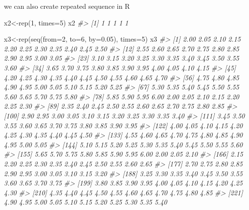 \documentclass[
]{article}
\newenvironment{Shaded}{\begin{snugshade}}{\end{snugshade}}
\newcommand{\AttributeTok}[1]{\textcolor[rgb]{0.77,0.63,0.00}{#1}}
\newcommand{\CommentTok}[1]{\textcolor[rgb]{0.56,0.35,0.01}{\textit{#1}}}
\newcommand{\DecValTok}[1]{\textcolor[rgb]{0.00,0.00,0.81}{#1}}
\newcommand{\FloatTok}[1]{\textcolor[rgb]{0.00,0.00,0.81}{#1}}
\newcommand{\FunctionTok}[1]{\textcolor[rgb]{0.00,0.00,0.00}{#1}}
\newcommand{\NormalTok}[1]{#1}
\newcommand{\OtherTok}[1]{\textcolor[rgb]{0.56,0.35,0.01}{#1}}
\begin{document}
we can also create repeated sequence in R

\begin{Shaded}
\begin{Highlighting}[]
\NormalTok{x2}\OtherTok{\textless{}{-}}\FunctionTok{rep}\NormalTok{(}\DecValTok{1}\NormalTok{, }\AttributeTok{times=}\DecValTok{5}\NormalTok{)}
\NormalTok{x2}
\CommentTok{\#\textgreater{} [1] 1 1 1 1 1}

\NormalTok{x3}\OtherTok{\textless{}{-}}\FunctionTok{rep}\NormalTok{(}\FunctionTok{seq}\NormalTok{(}\AttributeTok{from=}\DecValTok{2}\NormalTok{, }\AttributeTok{to=}\DecValTok{6}\NormalTok{, }\AttributeTok{by=}\FloatTok{0.05}\NormalTok{), }\AttributeTok{times=}\DecValTok{5}\NormalTok{)}
\NormalTok{x3}
\CommentTok{\#\textgreater{}   [1] 2.00 2.05 2.10 2.15 2.20 2.25 2.30 2.35 2.40 2.45 2.50}
\CommentTok{\#\textgreater{}  [12] 2.55 2.60 2.65 2.70 2.75 2.80 2.85 2.90 2.95 3.00 3.05}
\CommentTok{\#\textgreater{}  [23] 3.10 3.15 3.20 3.25 3.30 3.35 3.40 3.45 3.50 3.55 3.60}
\CommentTok{\#\textgreater{}  [34] 3.65 3.70 3.75 3.80 3.85 3.90 3.95 4.00 4.05 4.10 4.15}
\CommentTok{\#\textgreater{}  [45] 4.20 4.25 4.30 4.35 4.40 4.45 4.50 4.55 4.60 4.65 4.70}
\CommentTok{\#\textgreater{}  [56] 4.75 4.80 4.85 4.90 4.95 5.00 5.05 5.10 5.15 5.20 5.25}
\CommentTok{\#\textgreater{}  [67] 5.30 5.35 5.40 5.45 5.50 5.55 5.60 5.65 5.70 5.75 5.80}
\CommentTok{\#\textgreater{}  [78] 5.85 5.90 5.95 6.00 2.00 2.05 2.10 2.15 2.20 2.25 2.30}
\CommentTok{\#\textgreater{}  [89] 2.35 2.40 2.45 2.50 2.55 2.60 2.65 2.70 2.75 2.80 2.85}
\CommentTok{\#\textgreater{} [100] 2.90 2.95 3.00 3.05 3.10 3.15 3.20 3.25 3.30 3.35 3.40}
\CommentTok{\#\textgreater{} [111] 3.45 3.50 3.55 3.60 3.65 3.70 3.75 3.80 3.85 3.90 3.95}
\CommentTok{\#\textgreater{} [122] 4.00 4.05 4.10 4.15 4.20 4.25 4.30 4.35 4.40 4.45 4.50}
\CommentTok{\#\textgreater{} [133] 4.55 4.60 4.65 4.70 4.75 4.80 4.85 4.90 4.95 5.00 5.05}
\CommentTok{\#\textgreater{} [144] 5.10 5.15 5.20 5.25 5.30 5.35 5.40 5.45 5.50 5.55 5.60}
\CommentTok{\#\textgreater{} [155] 5.65 5.70 5.75 5.80 5.85 5.90 5.95 6.00 2.00 2.05 2.10}
\CommentTok{\#\textgreater{} [166] 2.15 2.20 2.25 2.30 2.35 2.40 2.45 2.50 2.55 2.60 2.65}
\CommentTok{\#\textgreater{} [177] 2.70 2.75 2.80 2.85 2.90 2.95 3.00 3.05 3.10 3.15 3.20}
\CommentTok{\#\textgreater{} [188] 3.25 3.30 3.35 3.40 3.45 3.50 3.55 3.60 3.65 3.70 3.75}
\CommentTok{\#\textgreater{} [199] 3.80 3.85 3.90 3.95 4.00 4.05 4.10 4.15 4.20 4.25 4.30}
\CommentTok{\#\textgreater{} [210] 4.35 4.40 4.45 4.50 4.55 4.60 4.65 4.70 4.75 4.80 4.85}
\CommentTok{\#\textgreater{} [221] 4.90 4.95 5.00 5.05 5.10 5.15 5.20 5.25 5.30 5.35 5.40}

\end{Highlighting}
\end{Shaded}
\end{document}
